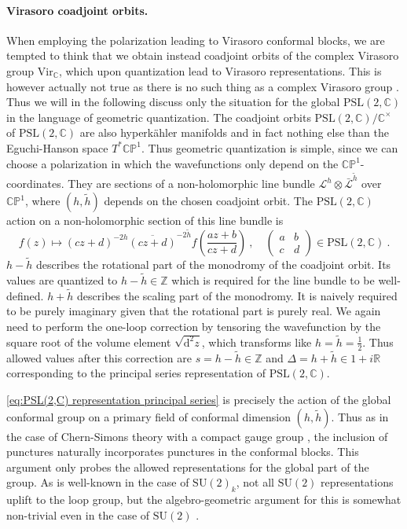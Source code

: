 \documentclass[12pt,a4paper]{article}
\newcommand{\be}{\begin{equation}}
\newcommand{\ee}{\end{equation}}
\newcommand\PSL{\text{PSL}}
\newcommand\CC{\mathbb{C}}
\newcommand\ZZ{\mathbb{Z}}
\newcommand\RR{\mathbb{R}}
\newcommand\CP{\mathbb{CP}}
\renewcommand\d{\text{d}}
\begin{document}
\paragraph{Virasoro coadjoint orbits.} When employing the polarization leading to Virasoro conformal blocks, we are tempted to think that we obtain instead coadjoint orbits of the complex Virasoro group $\mathrm{Vir}_\CC$, which upon quantization lead to Virasoro representations. This is however actually not true as there is no such thing as a complex Virasoro group \cite{Lempert}. Thus we will in the following discuss only the situation for the global $\PSL(2,\CC)$ in the language of geometric quantization. The coadjoint orbits $\PSL(2,\CC)/\CC^\times$ of $\PSL(2,\CC)$ are also hyperk\"ahler manifolds \cite{Hitchin_1979,Kronheimer1990AHS} and in fact nothing else than the Eguchi-Hanson space $T^*\CP^1$. Thus geometric quantization is simple, since we can choose a polarization in which the wavefunctions only depend on the $\CP^1$-coordinates. They are sections of a non-holomorphic line bundle $\mathscr{L}^h \otimes \bar{\mathscr{L}}^{\tilde{h}}$ over $\CP^1$, where $(h,\tilde{h})$ depends on the chosen coadjoint orbit. The $\PSL(2,\CC)$ action on a non-holomorphic section of this line bundle is
\be 
f(z) \longmapsto (c z+d)^{-2h}\overline{(c z+d)}^{-2\tilde{h}} f \left(\frac{a z+b}{c z+d} \right)~, \quad \begin{pmatrix}
    a & b \\ c & d
\end{pmatrix} \in \PSL(2,\CC)~. \label{eq:PSL(2,C) representation principal series}
\ee
$h-\tilde{h}$ describes the rotational part of the monodromy of the coadjoint orbit. Its values are quantized to $h-\tilde{h} \in \ZZ$ which is required for the line bundle to be well-defined. $h+\tilde{h}$ describes the scaling part of the monodromy. It is naively required to be purely imaginary given that the rotational part is purely real. 
We again need to perform the one-loop correction by tensoring the wavefunction by the square root of the volume element $\sqrt{\d^2z}$, which transforms like $h=\tilde{h}=\frac{1}{2}$. Thus allowed values after this correction are $s=h-\tilde{h} \in \ZZ$ and $\Delta=h+\tilde{h} \in 1+i \RR$ corresponding to the principal series representation of $\PSL(2,\CC)$.

\eqref{eq:PSL(2,C) representation principal series} is precisely the action of the global conformal group on a primary field of conformal dimension $(h,\tilde{h})$. Thus as in the case of Chern-Simons theory with a compact gauge group \cite{Witten:1988hf}, the inclusion of punctures naturally incorporates punctures in the conformal blocks. This argument only probes the allowed representations for the global part of the group. As is well-known in the case of $\mathrm{SU}(2)_k$, not all $\mathrm{SU}(2)$ representations uplift to the loop group, but the algebro-geometric argument for this is somewhat non-trivial even in the case of $\mathrm{SU}(2)$ \cite{Gawedzki:1990qt}. 
\end{document}
